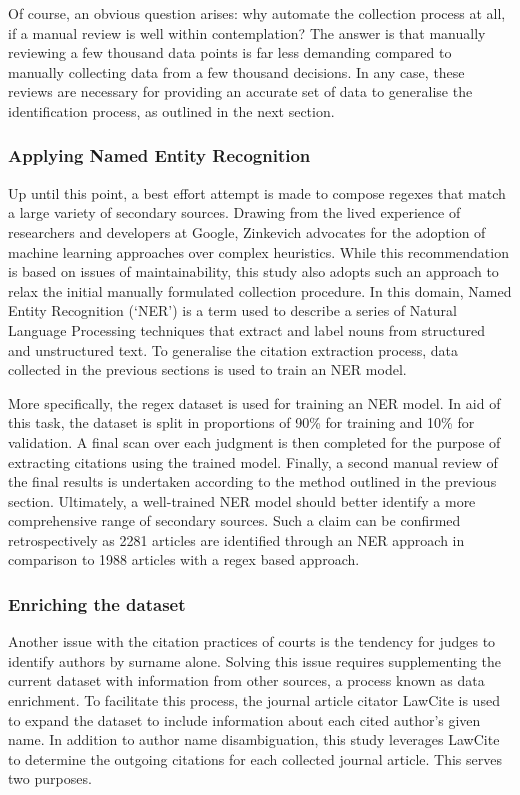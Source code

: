 Of course, an obvious question arises: why automate the collection process at all, if a manual review is well within contemplation? The answer is that manually reviewing a few thousand data points is far less demanding compared to manually collecting data from a few thousand decisions. In any case, these reviews are necessary for providing an accurate set of data to generalise the identification process, as outlined in the next section.

\subsubsection{Applying Named Entity Recognition}

Up until this point, a best effort attempt is made to compose regexes that match a large variety of secondary sources. Drawing from the lived experience of researchers and developers at Google, Zinkevich advocates for the adoption of machine learning approaches over complex heuristics. While this recommendation is based on issues of maintainability, this study also adopts such an approach to relax the initial manually formulated collection procedure. In this domain, Named Entity Recognition (`NER') is a term used to describe a series of Natural Language Processing techniques that extract and label nouns from structured and unstructured text. To generalise the citation extraction process, data collected in the previous sections is used to train an NER model.

More specifically, the regex dataset is used for training an NER model. In aid of this task, the dataset is split in proportions of 90\% for training and 10\% for validation. A final scan over each judgment is then completed for the purpose of extracting citations using the trained model. Finally, a second manual review of the final results is undertaken according to the method outlined in the previous section. Ultimately, a well-trained NER model should better identify a more comprehensive range of secondary sources. Such a claim can be confirmed retrospectively as 2281 articles are identified through an NER approach in comparison to 1988 articles with a regex based approach.

\subsubsection{Enriching the dataset}

Another issue with the citation practices of courts is the tendency for judges to identify authors by surname alone. Solving this issue requires supplementing the current dataset with information from other sources, a process known as data enrichment. To facilitate this process, the journal article citator LawCite is used to expand the dataset to include information about each cited author's given name. In addition to author name disambiguation, this study leverages LawCite to determine the outgoing citations for each collected journal article. This serves two purposes.


